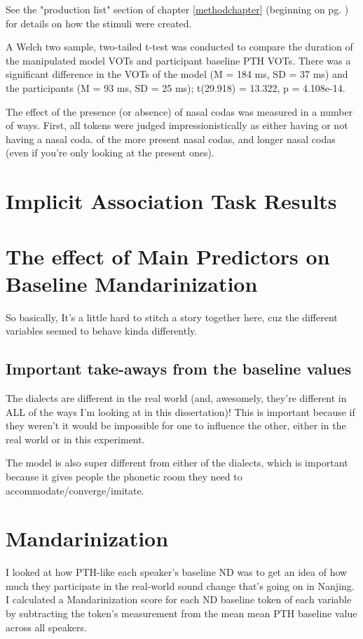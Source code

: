 See the "production list" section of chapter \ref{methodchapter} (beginning on pg. \pageref{para:prodList}) for details on how the stimuli were created.

A Welch two sample, two-tailed t-test was conducted to compare the duration of the manipulated model VOTs and participant baseline PTH VOTs. There was a significant difference in the VOTs of the model (M = 184 ms, SD = 37 ms) and the participants (M = 93 ms, SD = 25 ms); t(29.918) = 13.322, p = 4.108e-14.

The effect of the presence (or absence) of nasal codas was measured in a number of ways. First, all tokens were judged impressionistically as either having or not having a nasal coda. of the more present nasal codas, and longer nasal codas (even if you're only looking at the present ones).


\section{Implicit Association Task Results}
\label{sec:IATresults}

\section{The effect of Main Predictors on Baseline Mandarinization}
\label{sec:basemandfactors}
So basically, It's a little hard to stitch a story together here, cuz the different variables seemed to behave kinda differently. 
\subsection{Important take-aways from the baseline values}

The dialects are different in the real world (and, awesomely, they're different in ALL of the ways I'm looking at in this dissertation)! This is important because if they weren't it would be impossible for one to influence the other, either in the real world or in this experiment.

The model is also super different from either of the dialects, which is important because it gives people the phonetic room they need to accommodate/converge/imitate.

\section{Mandarinization}

I looked at how PTH-like each speaker's baseline ND was to get an idea of how much they participate in the real-world sound change that's going on in Nanjing. I calculated a Mandarinization score for each ND baseline token of each variable by subtracting the token's measurement from the mean mean PTH baseline value across all speakers.